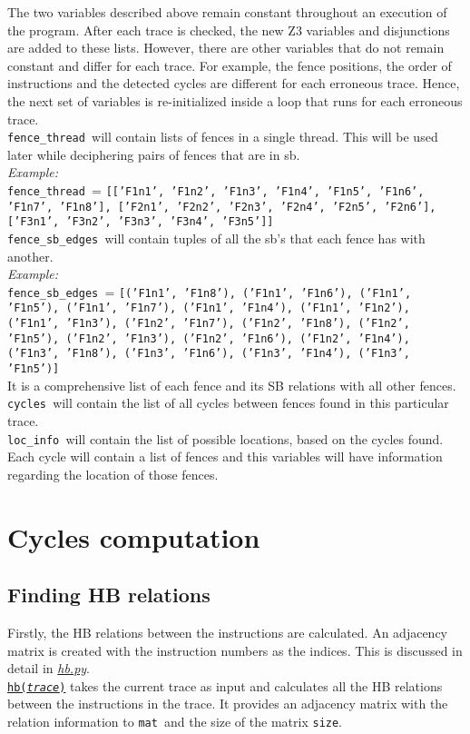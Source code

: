 \documentclass{article}
\newcommand{\var}[1]{\color{OliveGreen} \texttt{#1}\color{black}}
\newcommand{\fun}[2]{\color{Sepia}\texttt{#1(\color{Gray}\textit{#2}\color{Sepia})}\color{black}}
\newcommand{\varinfo}[1]{\scriptsize \texttt{#1} \normalsize}
\begin{document}
The two variables described above remain constant throughout an execution of the program. After each trace is checked, the new Z3 variables and disjunctions are added to these lists. However, there are other variables that do not remain constant and differ for each trace. For example, the fence positions, the order of instructions and the detected cycles are different for each erroneous trace. Hence, the next set of variables is re-initialized inside a loop that runs for each erroneous trace.\\

\var{fence\_thread }will contain lists of fences in a single thread. This will be used later while deciphering pairs of fences that are in sb.\\
\textit{Example:}\\
\var{fence\_thread }= \varinfo{[['F1n1', 'F1n2', 'F1n3', 'F1n4', 'F1n5', 'F1n6', 'F1n7', 'F1n8'], ['F2n1', 'F2n2', 'F2n3', 'F2n4', 'F2n5', 'F2n6'], ['F3n1', 'F3n2', 'F3n3', 'F3n4', 'F3n5']]}\\

\var{fence\_sb\_edges }will contain tuples of all the sb's that each fence has with another.\\
\textit{Example:}\\
\var{fence\_sb\_edges }= \varinfo{[('F1n1', 'F1n8'), ('F1n1', 'F1n6'), ('F1n1', 'F1n5'), ('F1n1', 'F1n7'), ('F1n1', 'F1n4'), ('F1n1', 'F1n2'), ('F1n1', 'F1n3'), ('F1n2', 'F1n7'), ('F1n2', 'F1n8'), ('F1n2', 'F1n5'), ('F1n2', 'F1n3'), ('F1n2', 'F1n6'), ('F1n2', 'F1n4'), ('F1n3', 'F1n8'), ('F1n3', 'F1n6'), ('F1n3', 'F1n4'), ('F1n3', 'F1n5')]}\\
It is a comprehensive list of each fence and its SB relations with all other fences.\\

\var{cycles }will contain the list of all cycles between fences found in this particular trace.\\

\var{loc\_info }will contain the list of possible locations, based on the cycles found. Each cycle will contain a list of fences and this variables will have information regarding the location of those fences.\\

\section{Cycles computation}
\par
\subsection{Finding HB relations}
Firstly, the HB relations between the instructions are calculated. An adjacency matrix is created with the instruction numbers as the indices. This is discussed in detail in \href{hb.tex}{\textit{hb.py}}.\\
\href{hb.tex}{\fun{hb}{trace}} takes the current trace as input and calculates all the HB relations between the instructions in the trace. It provides an adjacency matrix with the relation information to \var{mat }and the size of the matrix \var{size}.
\end{document}

